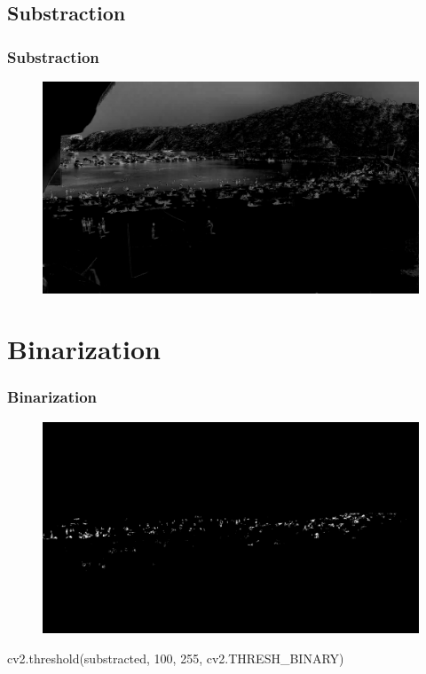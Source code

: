 \documentclass{beamer}
\begin{document}
\subsection*{Substraction}
\begin{frame}
    \frametitle{Substraction}
    \begin{figure}
        \centering
        \includegraphics[width=\textwidth]{../gen/sub/1660305600.jpg}
    \end{figure}
\end{frame}

\section{Binarization}
\begin{frame}
    \frametitle{Binarization}
    \begin{figure}
        \centering
        \includegraphics[width=\textwidth]{../gen/bin/1660305600.jpg}
    \end{figure}
   
        cv2.threshold(substracted, 100, 255, cv2.THRESH\_BINARY)
\end{frame}
\end{document}
